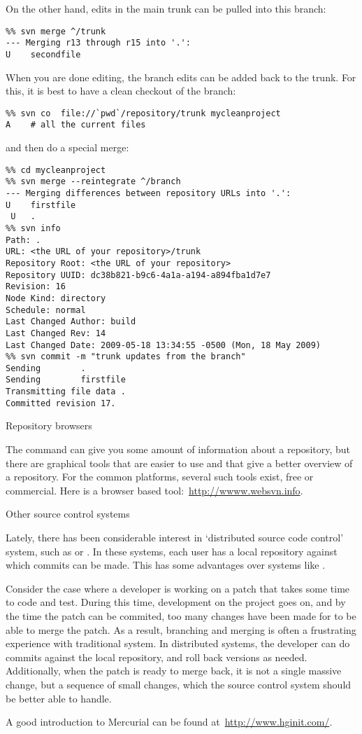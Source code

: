 On the other hand, edits in the main trunk can be pulled into this
branch:
\begin{verbatim}
%% svn merge ^/trunk
--- Merging r13 through r15 into '.':
U    secondfile
\end{verbatim}
When you are done editing, the branch edits can be added back to the
trunk. For this, it is best to have a clean checkout of the branch:
\begin{verbatim}
%% svn co  file://`pwd`/repository/trunk mycleanproject
A    # all the current files
\end{verbatim}
and then do a special merge:
\begin{verbatim}
%% cd mycleanproject
%% svn merge --reintegrate ^/branch
--- Merging differences between repository URLs into '.':
U    firstfile
 U   .
%% svn info
Path: .
URL: <the URL of your repository>/trunk
Repository Root: <the URL of your repository>
Repository UUID: dc38b821-b9c6-4a1a-a194-a894fba1d7e7
Revision: 16
Node Kind: directory
Schedule: normal
Last Changed Author: build
Last Changed Rev: 14
Last Changed Date: 2009-05-18 13:34:55 -0500 (Mon, 18 May 2009)
%% svn commit -m "trunk updates from the branch"
Sending        .
Sending        firstfile
Transmitting file data .
Committed revision 17.
\end{verbatim}

 {Repository browsers}

The  command can give you some amount of information about a
repository, but there are graphical tools that are easier to use and
that give a better overview of a repository. For the common platforms,
several such tools exist, free or commercial. Here is a browser based
tool:~\url{http://wwww.websvn.info}.


 {Other source control systems}

Lately, there has been considerable interest in `distributed source
code control' system, such as  or
. In these systems, each user has a local
repository against which commits can be made. This has some advantages
over systems like .

Consider the case where a developer is working on a  patch that takes some
time to code and test. During this time, development on the project
goes on, and by the time the patch can be commited, too many changes
have been made for  to be able to merge the patch. As a result,
branching and merging is often a frustrating experience with
traditional system. In distributed systems, the developer can do
commits against the local repository, and roll back versions as
needed. Additionally, when the patch is ready to merge back, it is not
a single massive change, but a sequence of small changes, which the
source control system should be better able to handle.

A good introduction to Mercurial can be found
at~\url{http://www.hginit.com/}.
